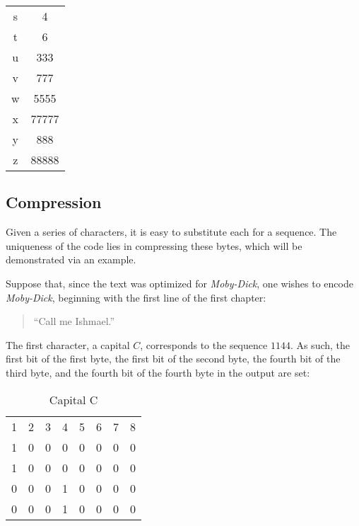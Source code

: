 \documentclass{article}
\begin{document}
\begin{multicols}{2}
\begin{supertabular}{|c|c|}
        s & 4 \\
        t & 6 \\
        u & 333 \\
        v & 777 \\
        w & 5555 \\
        x & 77777 \\
        y & 888 \\
        z & 88888 \\
\end{supertabular}

\end{multicols}

\subsection{Compression}
Given a series of characters, it is easy to substitute each for a sequence.  The uniqueness of the code lies in compressing these bytes, which will be demonstrated via an example.

Suppose that, since the text was optimized for \textit{Moby-Dick}, one wishes to encode \textit{Moby-Dick}, beginning with the first line of the first chapter:
\begin{quote}
``Call me Ishmael.''
\end{quote}
The first character, a capital $C$, corresponds to the sequence $1144$.  As such, the first bit of the first byte, the first bit of the second byte, the fourth bit of the third byte, and the fourth bit of the fourth byte in the output are set:

\begin{table}
    \centering
    \begin{tabular}{cccccccc}
        1 & 2 & 3 & 4 & 5 & 6 & 7 & 8\\
        1 & 0 & 0 & 0 & 0 & 0 & 0 & 0\\
        1 & 0 & 0 & 0 & 0 & 0 & 0 & 0\\
        0 & 0 & 0 & 1 & 0 & 0 & 0 & 0\\
        0 & 0 & 0 & 1 & 0 & 0 & 0 & 0\\
    \end{tabular}
    \caption{Capital C}
    \label{tab:my_label}
\end{table}
\end{document}

